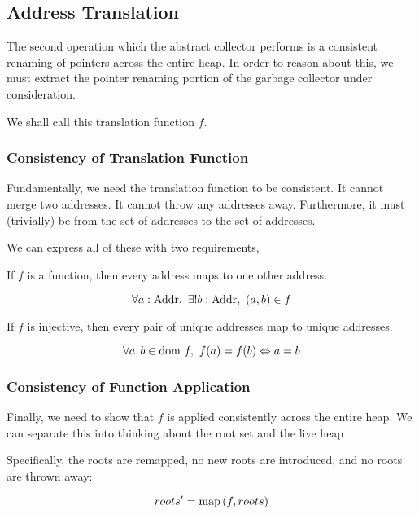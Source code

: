 \subsection{Address Translation}

The second operation which the abstract \gls{collector} performs is a
consistent renaming of \glspl{pointer} across the entire
\gls{heap}. In order to reason about this, we must extract the
\gls{pointer} renaming portion of the \gls{garbage collector} under
consideration.

We shall call this translation function $f$.

\subsubsection{Consistency of Translation Function}

Fundamentally, we need the translation function to be consistent. It
cannot merge two addresses. It cannot throw any addresses
away. Furthermore, it must (trivially) be from the set of addresses to
the set of addresses.

We can express all of these with two requirements,

\begin{lemma}
  If $f$ is a function, then every address maps to one other address.

  \[\forall a : \mathrm{Addr},\ \exists ! b : \mathrm{Addr},\ (a, b) \in f\]
\end{lemma}

\begin{lemma}
  If $f$ is injective, then every pair of unique addresses map to
  unique addresses.

  \[\forall a, b \in \mathrm{dom}~f,\ f(a) = f(b) \Leftrightarrow a = b\]
\end{lemma}

\subsubsection{Consistency of Function Application}

Finally, we need to show that $f$ is applied consistently across the
entire \gls{heap}. We can separate this into thinking about the
\gls{root} set and the live \gls{heap}

\begin{lemma}
  Specifically, the roots are remapped, no new roots are introduced,
  and no roots are thrown away:

  \[roots' = \mathrm{map}\left(f, roots\right)\]
\end{lemma}

